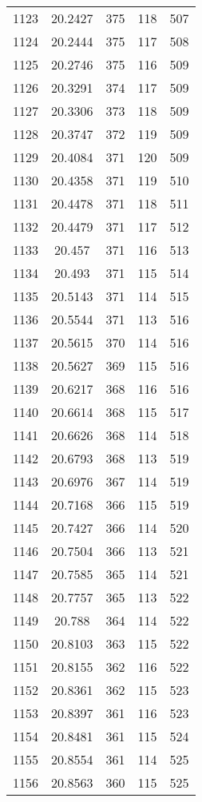 \documentclass[12pt,a4paper]{article}
\begin{document}
\begin{tabular}{r|cccc}
	1123 & 20.2427 & 375 & 118 & 507 \\
	1124 & 20.2444 & 375 & 117 & 508 \\
	1125 & 20.2746 & 375 & 116 & 509 \\
	1126 & 20.3291 & 374 & 117 & 509 \\
	1127 & 20.3306 & 373 & 118 & 509 \\
	1128 & 20.3747 & 372 & 119 & 509 \\
	1129 & 20.4084 & 371 & 120 & 509 \\
	1130 & 20.4358 & 371 & 119 & 510 \\
	1131 & 20.4478 & 371 & 118 & 511 \\
	1132 & 20.4479 & 371 & 117 & 512 \\
	1133 & 20.457 & 371 & 116 & 513 \\
	1134 & 20.493 & 371 & 115 & 514 \\
	1135 & 20.5143 & 371 & 114 & 515 \\
	1136 & 20.5544 & 371 & 113 & 516 \\
	1137 & 20.5615 & 370 & 114 & 516 \\
	1138 & 20.5627 & 369 & 115 & 516 \\
	1139 & 20.6217 & 368 & 116 & 516 \\
	1140 & 20.6614 & 368 & 115 & 517 \\
	1141 & 20.6626 & 368 & 114 & 518 \\
	1142 & 20.6793 & 368 & 113 & 519 \\
	1143 & 20.6976 & 367 & 114 & 519 \\
	1144 & 20.7168 & 366 & 115 & 519 \\
	1145 & 20.7427 & 366 & 114 & 520 \\
	1146 & 20.7504 & 366 & 113 & 521 \\
	1147 & 20.7585 & 365 & 114 & 521 \\
	1148 & 20.7757 & 365 & 113 & 522 \\
	1149 & 20.788 & 364 & 114 & 522 \\
	1150 & 20.8103 & 363 & 115 & 522 \\
	1151 & 20.8155 & 362 & 116 & 522 \\
	1152 & 20.8361 & 362 & 115 & 523 \\
	1153 & 20.8397 & 361 & 116 & 523 \\
	1154 & 20.8481 & 361 & 115 & 524 \\
	1155 & 20.8554 & 361 & 114 & 525 \\
	1156 & 20.8563 & 360 & 115 & 525 \\

\end{tabular}
\end{document}
